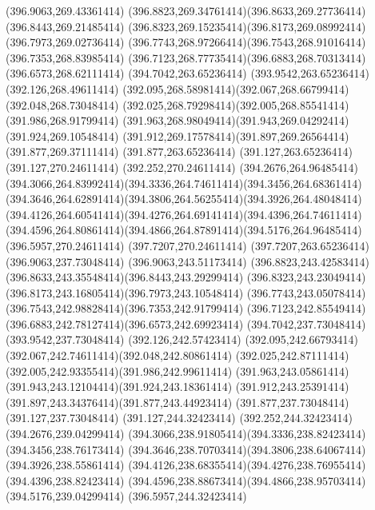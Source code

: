 {{	\lineto(396.9063,269.43361414)
	\curveto(396.8823,269.34761414)(396.8633,269.27736414)(396.8443,269.21485414)
	\curveto(396.8323,269.15235414)(396.8173,269.08992414)(396.7973,269.02736414)
	\curveto(396.7743,268.97266414)(396.7543,268.91016414)(396.7353,268.83985414)
	\curveto(396.7123,268.77735414)(396.6883,268.70313414)(396.6573,268.62111414)
	\lineto(394.7042,263.65236414)
	\lineto(393.9542,263.65236414)
	\lineto(392.126,268.49611414)
	\curveto(392.095,268.58981414)(392.067,268.66799414)(392.048,268.73048414)
	\curveto(392.025,268.79298414)(392.005,268.85541414)(391.986,268.91799414)
	\curveto(391.963,268.98049414)(391.943,269.04292414)(391.924,269.10548414)
	\curveto(391.912,269.17578414)(391.897,269.26564414)(391.877,269.37111414)
	\lineto(391.877,263.65236414)
	\lineto(391.127,263.65236414)
	\lineto(391.127,270.24611414)
	\lineto(392.252,270.24611414)
	\lineto(394.2676,264.96485414)
	\curveto(394.3066,264.83992414)(394.3336,264.74611414)(394.3456,264.68361414)
	\curveto(394.3646,264.62891414)(394.3806,264.56255414)(394.3926,264.48048414)
	\curveto(394.4126,264.60541414)(394.4276,264.69141414)(394.4396,264.74611414)
	\curveto(394.4596,264.80861414)(394.4866,264.87891414)(394.5176,264.96485414)
	\lineto(396.5957,270.24611414)
	\lineto(397.7207,270.24611414)
	\lineto(397.7207,263.65236414)
	\closepath
	\moveto(396.9063,237.73048414)
	\lineto(396.9063,243.51173414)
	\curveto(396.8823,243.42583414)(396.8633,243.35548414)(396.8443,243.29299414)
	\curveto(396.8323,243.23049414)(396.8173,243.16805414)(396.7973,243.10548414)
	\curveto(396.7743,243.05078414)(396.7543,242.98828414)(396.7353,242.91799414)
	\curveto(396.7123,242.85549414)(396.6883,242.78127414)(396.6573,242.69923414)
	\lineto(394.7042,237.73048414)
	\lineto(393.9542,237.73048414)
	\lineto(392.126,242.57423414)
	\curveto(392.095,242.66793414)(392.067,242.74611414)(392.048,242.80861414)
	\curveto(392.025,242.87111414)(392.005,242.93355414)(391.986,242.99611414)
	\curveto(391.963,243.05861414)(391.943,243.12104414)(391.924,243.18361414)
	\curveto(391.912,243.25391414)(391.897,243.34376414)(391.877,243.44923414)
	\lineto(391.877,237.73048414)
	\lineto(391.127,237.73048414)
	\lineto(391.127,244.32423414)
	\lineto(392.252,244.32423414)
	\lineto(394.2676,239.04299414)
	\curveto(394.3066,238.91805414)(394.3336,238.82423414)(394.3456,238.76173414)
	\curveto(394.3646,238.70703414)(394.3806,238.64067414)(394.3926,238.55861414)
	\curveto(394.4126,238.68355414)(394.4276,238.76955414)(394.4396,238.82423414)
	\curveto(394.4596,238.88673414)(394.4866,238.95703414)(394.5176,239.04299414)
	\lineto(396.5957,244.32423414)
}}

